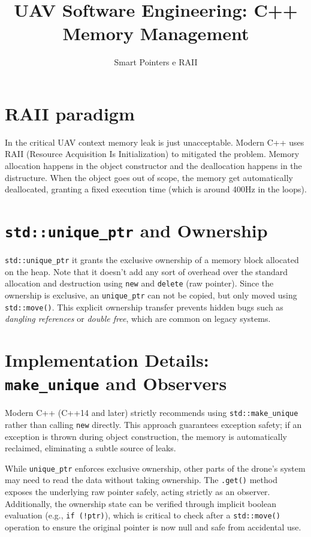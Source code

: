 \documentclass{article}
\title{UAV Software Engineering: C++ Memory Management}
\author{Smart Pointers e RAII}
\date{}
\begin{document}
\maketitle

\section{RAII paradigm}
In the critical UAV context memory leak is just unacceptable. 
Modern C++ uses RAII (Resource Acquisition Is Initialization) to mitigated the problem. 
Memory allocation happens in the object constructor and the deallocation happens in the distructure. 
When the object goes out of scope, the memory get automatically deallocated, granting a fixed execution time (which is around 400Hz in the loops).

\section{\texttt{std::unique\_ptr} and Ownership}
\texttt{std::unique\_ptr} it grants the exclusive ownership of a memory block allocated on the heap. 
Note that it doesn't add any sort of overhead over the standard allocation and destruction using \texttt{new} and \texttt{delete} (raw pointer).
Since the ownership is exclusive, an \texttt{unique\_ptr} can not be copied, but only moved using \texttt{std::move()}. 
This explicit ownership transfer prevents hidden bugs such as \textit{dangling references} or \textit{double free}, which are common on legacy systems.

\section{Implementation Details: \texttt{make\_unique} and Observers}
Modern C++ (C++14 and later) strictly recommends using \texttt{std::make\_unique} rather than calling \texttt{new} directly. 
This approach guarantees exception safety; if an exception is thrown during object construction, the memory is automatically reclaimed, 
eliminating a subtle source of leaks.

While \texttt{unique\_ptr} enforces exclusive ownership, other parts of the drone's system may need to read the data without taking ownership.
The \texttt{.get()} method exposes the underlying raw pointer safely, acting strictly as an observer. 
Additionally, the ownership state can be verified through implicit boolean evaluation (e.g., \texttt{if (!ptr)}), 
which is critical to check after a \texttt{std::move()} operation to ensure the original pointer is now null and safe from accidental use.
\end{document}
